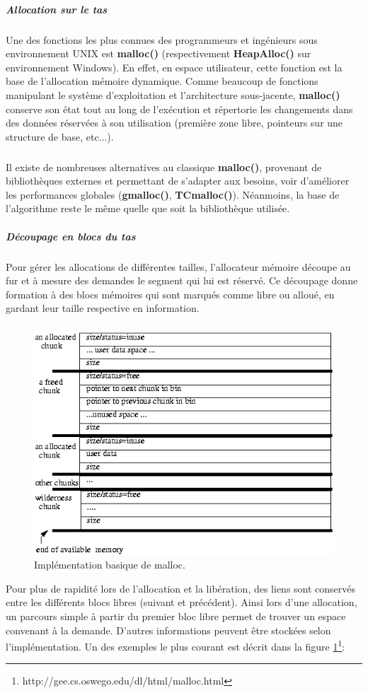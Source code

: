\subparagraph{Allocation sur le tas}
Une des fonctions les plus connues des programmeurs et ingénieurs sous environnement UNIX est \textbf{malloc()} (respectivement \textbf{HeapAlloc()} sur
environnement Windows). En effet, en espace utilisateur, cette fonction est la base de l'allocation mémoire dynamique. Comme beaucoup de fonctions
manipulant le système d'exploitation et l'architecture sous-jacente, \textbf{malloc()} conserve son état tout au long de l'exécution et répertorie les
changements dans des données réservées à son utilisation (première zone libre, pointeurs sur une structure de base, etc...).
\subparagraph{}
Il existe de nombreuses alternatives au classique \textbf{malloc()}, provenant de bibliothèques externes et permettant de s'adapter aux besoins, voir d'améliorer les
performances globales (\textbf{gmalloc()}, \textbf{TCmalloc()}). Néanmoins, la base de l'algorithme reste le même quelle que soit la bibliothèque utilisée.

\subparagraph{Découpage en blocs du tas}
Pour gérer les allocations de différentes tailles, l'allocateur mémoire découpe au fur et à mesure des demandes
le segment qui lui est réservé. Ce découpage donne formation à des blocs mémoires qui sont marqués comme libre ou alloué, en gardant leur taille respective
en information.
\subparagraph{}
\begin{figure}
    \centering
    \includegraphics[scale=0.5]{images/malloc.png}\newline
    \caption{Implémentation basique de malloc.}
    \label{fig:malloc}
\end{figure}
Pour plus de rapidité lors de l'allocation et la libération, des liens sont conservés entre les différents blocs libres (suivant et précédent). Ainsi lors d'une allocation,
un parcours simple à partir du premier bloc libre permet de trouver un espace convenant à la demande. D'autres informations peuvent être stockées selon l'implémentation.
Un des exemples le plus courant est décrit dans la figure \ref{fig:malloc}\footnote{http://gee.cs.oswego.edu/dl/html/malloc.html}:

